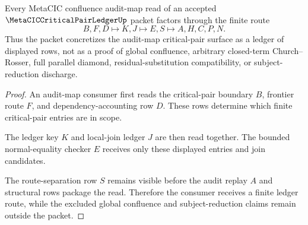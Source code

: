 \begin{theorem}
\label{thm:metacic-critical-pair-ledger-audit-route}
Every MetaCIC confluence audit-map read of an accepted $\MetaCICCriticalPairLedgerUp$ packet factors through the finite route
$$
B,F,D \longmapsto K,J \longmapsto E,S \longmapsto A,H,C,P,N .
$$
Thus the packet concretizes the audit-map critical-pair surface as a ledger of displayed rows, not as a proof of global confluence, arbitrary closed-term Church--Rosser, full parallel diamond, residual-substitution compatibility, or subject-reduction discharge.
\end{theorem}
\begin{proof}
An audit-map consumer first reads the critical-pair boundary $B$, frontier route $F$, and dependency-accounting row $D$. These rows determine which finite critical-pair entries are in scope.

The ledger key $K$ and local-join ledger $J$ are then read together. The bounded normal-equality checker $E$ receives only these displayed entries and join candidates.

The route-separation row $S$ remains visible before the audit replay $A$ and structural rows package the read. Therefore the consumer receives a finite ledger route, while the excluded global confluence and subject-reduction claims remain outside the packet.
\end{proof}

